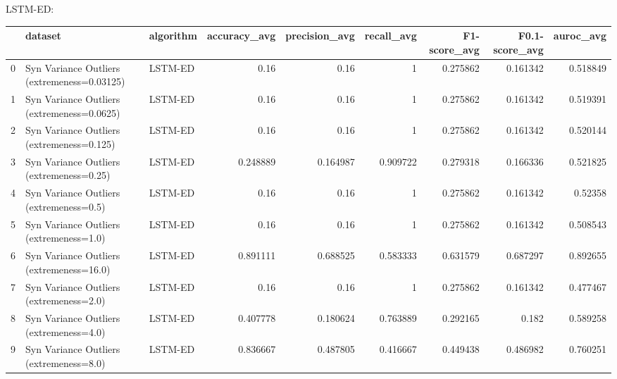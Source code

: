 LSTM-ED:

\begin{tabular}{rllrrrrrr}
\hline
    & dataset                                     & algorithm   &   accuracy\_avg &   precision\_avg &   recall\_avg &   F1-score\_avg &   F0.1-score\_avg &   auroc\_avg \\
\hline
  0 & Syn Variance Outliers (extremeness=0.03125) & LSTM-ED     &       0.16     &        0.16     &     1        &       0.275862 &         0.161342 &    0.518849 \\
  1 & Syn Variance Outliers (extremeness=0.0625)  & LSTM-ED     &       0.16     &        0.16     &     1        &       0.275862 &         0.161342 &    0.519391 \\
  2 & Syn Variance Outliers (extremeness=0.125)   & LSTM-ED     &       0.16     &        0.16     &     1        &       0.275862 &         0.161342 &    0.520144 \\
  3 & Syn Variance Outliers (extremeness=0.25)    & LSTM-ED     &       0.248889 &        0.164987 &     0.909722 &       0.279318 &         0.166336 &    0.521825 \\
  4 & Syn Variance Outliers (extremeness=0.5)     & LSTM-ED     &       0.16     &        0.16     &     1        &       0.275862 &         0.161342 &    0.52358  \\
  5 & Syn Variance Outliers (extremeness=1.0)     & LSTM-ED     &       0.16     &        0.16     &     1        &       0.275862 &         0.161342 &    0.508543 \\
  6 & Syn Variance Outliers (extremeness=16.0)    & LSTM-ED     &       0.891111 &        0.688525 &     0.583333 &       0.631579 &         0.687297 &    0.892655 \\
  7 & Syn Variance Outliers (extremeness=2.0)     & LSTM-ED     &       0.16     &        0.16     &     1        &       0.275862 &         0.161342 &    0.477467 \\
  8 & Syn Variance Outliers (extremeness=4.0)     & LSTM-ED     &       0.407778 &        0.180624 &     0.763889 &       0.292165 &         0.182    &    0.589258 \\
  9 & Syn Variance Outliers (extremeness=8.0)     & LSTM-ED     &       0.836667 &        0.487805 &     0.416667 &       0.449438 &         0.486982 &    0.760251 \\
\hline
\end{tabular}

